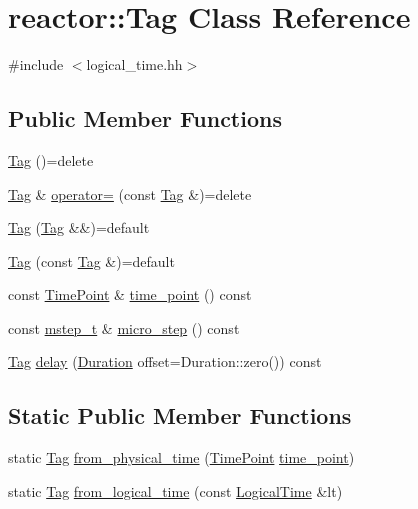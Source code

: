 \hypertarget{classreactor_1_1Tag}{}\section{reactor\+:\+:Tag Class Reference}
\label{classreactor_1_1Tag}


{\ttfamily \#include $<$logical\+\_\+time.\+hh$>$}

\subsection*{Public Member Functions}
\begin{DoxyCompactItemize}
\item 
\hyperlink{classreactor_1_1Tag_a25458048eeb77969069faee12894f6d4}{Tag} ()=delete
\item 
\hyperlink{classreactor_1_1Tag}{Tag} \& \hyperlink{classreactor_1_1Tag_ae0776e16fba93c8836ab0d1651ffd309}{operator=} (const \hyperlink{classreactor_1_1Tag}{Tag} \&)=delete
\item 
\hyperlink{classreactor_1_1Tag_aa810576d4b247523df94a623e36acbb3}{Tag} (\hyperlink{classreactor_1_1Tag}{Tag} \&\&)=default
\item 
\hyperlink{classreactor_1_1Tag_a83b08304268878143b98f83b0e6400ba}{Tag} (const \hyperlink{classreactor_1_1Tag}{Tag} \&)=default
\item 
const \hyperlink{namespacereactor_ad950f8d1a46612500286a4af0f167080}{Time\+Point} \& \hyperlink{classreactor_1_1Tag_a25ec5662af4fc8c9b34cf5cc0d70b569}{time\+\_\+point} () const
\item 
const \hyperlink{namespacereactor_aaea1189d617982457b74127ba74a7340}{mstep\+\_\+t} \& \hyperlink{classreactor_1_1Tag_a8cfdeeb03c2e48a684e1bc517505c087}{micro\+\_\+step} () const
\item 
\hyperlink{classreactor_1_1Tag}{Tag} \hyperlink{classreactor_1_1Tag_af4cf8dfbcef78f120e71562084e67168}{delay} (\hyperlink{namespacereactor_aa8375b807a80703545664096c5b5b779}{Duration} offset=Duration\+::zero()) const
\end{DoxyCompactItemize}
\subsection*{Static Public Member Functions}
\begin{DoxyCompactItemize}
\item 
static \hyperlink{classreactor_1_1Tag}{Tag} \hyperlink{classreactor_1_1Tag_ad0577aba35a17c5aac3dec8629977ae1}{from\+\_\+physical\+\_\+time} (\hyperlink{namespacereactor_ad950f8d1a46612500286a4af0f167080}{Time\+Point} \hyperlink{classreactor_1_1Tag_a25ec5662af4fc8c9b34cf5cc0d70b569}{time\+\_\+point})
\item 
static \hyperlink{classreactor_1_1Tag}{Tag} \hyperlink{classreactor_1_1Tag_a99d7fef2a7b8f865e8d69d45ea9cf17f}{from\+\_\+logical\+\_\+time} (const \hyperlink{classreactor_1_1LogicalTime}{Logical\+Time} \&lt)
\end{DoxyCompactItemize}
